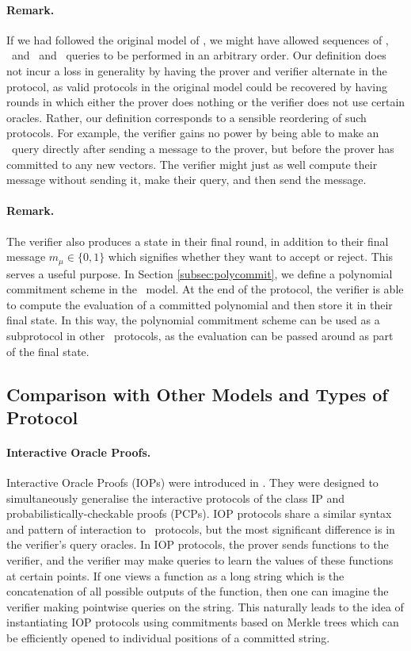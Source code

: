\paragraph{Remark.} If we had followed the original model of \cite{BootleCGGHJ17}, we might have allowed sequences of \ILCcommit, \ILCsend\ and \ILCopen\ and \ILCcheck\ queries to be performed in an arbitrary order. Our definition does not incur a loss in generality by having the prover and verifier alternate in the protocol, as valid protocols in the original model could be recovered by having rounds in which either the prover does nothing or the verifier does not use certain oracles. Rather, our definition corresponds to a sensible reordering of such protocols. For example, the verifier gains no power by being able to make an \ILCopen\ query directly after sending a message to the prover, but before the prover has committed to any new vectors. The verifier might just as well compute their message without sending it, make their query, and then send the message.

\paragraph{Remark.} The verifier also produces a state in their final round, in addition to their final message $m_\mu \in \lbrace 0,1 \rbrace$ which signifies whether they want to accept or reject. This serves a useful purpose. In Section \ref{subsec:polycommit}, we define a polynomial commitment scheme in the \ILC\ model. At the end of the protocol, the verifier is able to compute the evaluation of a committed polynomial and then store it in their final state. In this way, the polynomial commitment scheme can be used as a subprotocol in other \ILC\ protocols, as the evaluation can be passed around as part of the final state.

\subsection{Comparison with Other Models and Types of Protocol}

\paragraph{Interactive Oracle Proofs.} Interactive Oracle Proofs (IOPs) were introduced in \cite{Ben-SassonCS16}. They were designed to simultaneously generalise the interactive protocols of the class IP and probabilistically-checkable proofs (PCPs). IOP protocols share a similar syntax and pattern of interaction to \ILC\ protocols, but the most significant difference is in the verifier's query oracles. In IOP protocols, the prover sends functions to the verifier, and the verifier may make queries to learn the values of these functions at certain points. If one views a function as a long string which is the concatenation of all possible outputs of the function, then one can imagine the verifier making pointwise queries on the string. This naturally leads to the idea of instantiating IOP protocols using commitments based on Merkle trees \cite{Ben-SassonBHR18} which can be efficiently opened to individual positions of a committed string.


